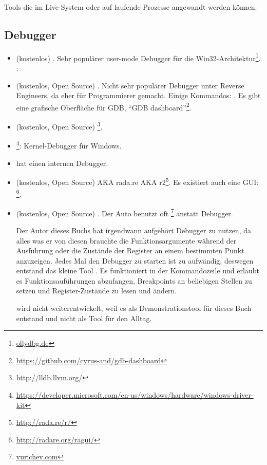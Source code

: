 
Tools die im Live-System oder auf laufende Prozesse angewandt werden können.

\subsection{Debugger}

\myindex{\olly}

\begin{itemize}
\item (kostenlos) .
Sehr populärer user-mode Debugger für die Win32-Architektur\footnote{\href{http://go.yurichev.com/17032}{ollydbg.de}}.
\ShortHotKeyCheatsheet: 

\item (kostenlos, Open Source) .
Nicht sehr populärer Debugger unter Reverse Engineers, da eher für Programmierer gemacht.
Einige Kommandos: .
Es gibt eine grafische Oberfläche für GDB, ``GDB dashboard''\footnote{\url{https://github.com/cyrus-and/gdb-dashboard}}.

\item (kostenlos, Open Source) \footnote{\url{http://lldb.llvm.org/}}.

\item {}\footnote{\url{https://developer.microsoft.com/en-us/windows/hardware/windows-driver-kit}}:
Kernel-Debugger für Windows.

\item {} hat einen internen Debugger.

\item (kostenlos, Open Source)  \ac{AKA} rada.re \ac{AKA} r2\footnote{\url{http://rada.re/r/}}.
Es existiert auch eine GUI: \footnote{\url{http://radare.org/ragui/}}.

\item (kostenlos, Open Source) .
\label{tracer}
Der Auto benutzt oft 
\footnote{\href{http://go.yurichev.com/17338}{yurichev.com}}
anstatt Debugger.

Der Autor dieses Buchs hat irgendwann aufgehört Debugger zu nutzen, da alles was er von diesen
brauchte die Funktionsargumente während der Ausführung oder die Zustände der Register an einem
bestimmten Punkt anzuzeigen.
Jedes Mal den Debugger zu starten ist zu aufwändig, deswegen entstand das kleine Tool .
Es funktioniert in der Kommandozeile und erlaubt es Funktionsauführungen abzufangen,
Breakpoints an beliebigen Stellen zu setzen und Register-Zustände zu lesen und ändern.

 wird nicht weiterentwickelt, weil es als Demonstrationstool für dieses Buch entstand
und nicht als Tool für den Alltag.
\end{itemize}

